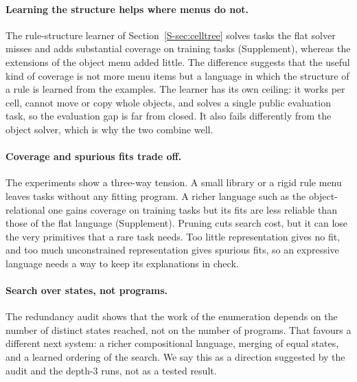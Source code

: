 \documentclass[sigconf,nonacm]{acmart}
\begin{document}
\paragraph{Learning the structure helps where menus do not.} The rule-structure learner of Section~\ref{S-sec:celltree} solves tasks the flat solver misses and adds substantial coverage on training tasks (Supplement), whereas the extensions of the object menu added little. The difference suggests that the useful kind of coverage is not more menu items but a language in which the structure of a rule is learned from the examples. The learner has its own ceiling: it works per cell, cannot move or copy whole objects, and solves a single public evaluation task, so the evaluation gap is far from closed. It also fails differently from the object solver, which is why the two combine well.

\paragraph{Coverage and spurious fits trade off.} The experiments show a three-way tension. A small library or a rigid rule menu leaves tasks without any fitting program. A richer language such as the object-relational one gains coverage on training tasks but its fits are less reliable than those of the flat language (Supplement). Pruning cuts search cost, but it can lose the very primitives that a rare task needs. Too little representation gives no fit, and too much unconstrained representation gives spurious fits, so an expressive language needs a way to keep its explanations in check.

\paragraph{Search over states, not programs.} The redundancy audit shows that the work of the enumeration depends on the number of distinct states reached, not on the number of programs. That favours a different next system: a richer compositional language, merging of equal states, and a learned ordering of the search. We say this as a direction suggested by the audit and the depth-3 runs, not as a tested result.
\end{document}
